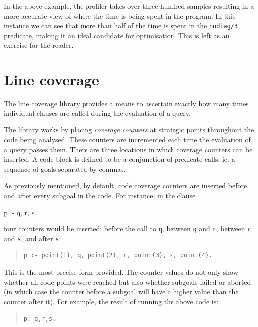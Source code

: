 In the above example, the profiler takes over three hundred samples
resulting in a more accurate view of where the time is being spent in
the program.  In this instance we can see that more than half of the
time is spent in the \verb+nodiag/3+ predicate, making it an ideal
candidate for optimisation.  This is left as an exercise for the
reader.


\section{Line coverage}
The line coverage library provides a means to ascertain exactly how
many times individual clauses are called during the evaluation of a
query.

The library works by placing \emph{coverage counters} at strategic
points throughout the code being analysed.  These counters are
incremented each time the evaluation of a query passes them.  There
are three locations in which coverage counters can be inserted.
A code block is defined to be a conjunction of predicate calls. ie. a
sequence of goals separated by commas.

As previously mentioned, by default, code coverage counters are
inserted before and after every subgoal in the code. For instance, in
the clause
\begin{code}
p :- q, r, s.
\end{code}
four counters would be inserted: before the call to \verb+q+, between
\verb+q+ and \verb+r+, between \verb+r+ and \verb+s+, and after
\verb+s+:
\begin{quote}\begin{verbatim}
p :- point(1), q, point(2), r, point(3), s, point(4).
\end{verbatim}\end{quote}


This is the most precise form provided. The counter values do not only
show whether all code points were reached but also whether subgoals
failed or aborted (in which case the counter before a subgoal will
have a higher value than the counter after it). For example, the
result of running the above code is:
\begin{quote}\begin{alltt}
p :-  q,  r,  s  .
\end{alltt}\end{quote}

